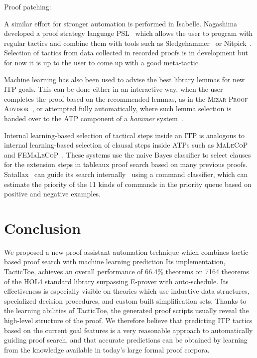 \documentclass[runningheads,a4paper,draft]{svjour3}
\def\holfour{\textsf{HOL4}\xspace}
\def\isabelle{\textsf{Isabelle}\xspace}
\def\eprover{\textsf{E-prover}\xspace}
\def\sledgehammer{\textsf{Sledgehammer}\xspace}
\def\tactictoe{\textsf{TacticToe}\xspace}
\begin{document}
Proof patching: \cite{RingerYLG18}

A similar effort for stronger automation is performed in \isabelle. Nagashima
developed a proof strategy language PSL~\cite{NagashimaK17psl} which allows the
user to
program with regular tactics and combine them with tools such as
\sledgehammer~\cite{sledgehammer10} or Nitpick~\cite{Nitpick10}.
Selection of tactics from data collected in recorded proofs is in development
but for now it is up to the user to come up with a good meta-tactic.


Machine learning has also been used to advise the best library lemmas for new
ITP goals.
This can be done either in an interactive way, when the user completes the
proof based on the recommended lemmas, as in the \textsc{Mizar Proof
Advisor}~\cite{Urb04-MPTP0}, or attempted fully automatically, where such lemma
selection is handed over to the ATP component of a \emph{hammer}
system~\cite{hammers4qed,tgck-cpp15,holyhammer,BlanchetteGKKU16,mizAR40}.

Internal learning-based selection of tactical steps inside an ITP is analogous
to internal learning-based selection of clausal steps inside ATPs such as
\textsc{MaLeCoP}~\cite{malecop} and \textsc{FEMaLeCoP}~\cite{femalecop}. These
systems
use the naive Bayes classifier to  select clauses for the extension steps in
tableaux proof search based on many previous proofs. Satallax~\cite{Brown2012a}
can guide its
search internally~\cite{mllax} using a command classifier, which can estimate
the priority of the 11 kinds of
commands in the priority queue based on positive and negative examples.


\section{Conclusion}\label{sec:concl}

We proposed a new proof assistant automation technique which combines
tactic-based proof search with machine learning prediction
Its implementation, \tactictoe, achieves an overall performance of 66.4\% 
theorems on 7164 theorems of the \holfour standard library surpassing \eprover 
with auto-schedule. Its
effectiveness is especially visible on
theories which use inductive data structures, specialized decision procedures,
and custom built simplification sets.
Thanks to the learning abilities of \tactictoe, the generated proof scripts
usually reveal the high-level structure of the proof. %
We therefore believe that predicting ITP tactics based on the current goal
features is a very reasonable approach to automatically guiding proof search,
and that accurate predictions can be obtained by learning from the knowledge
available in today's large formal proof corpora.
\end{document}
